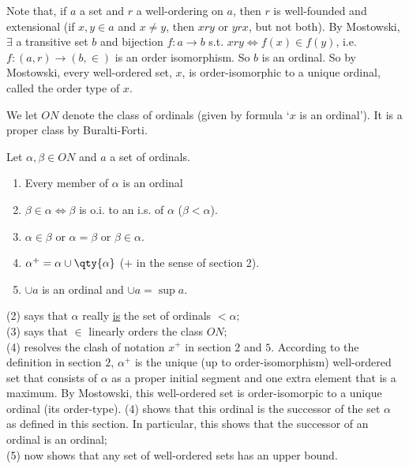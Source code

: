Note that, if $a$ a set and $r$ a well-ordering on $a$, then $r$ is well-founded and extensional (if $x, y \in a$ and $x \neq y$, then $xry$ or $yrx$, but not both).
By Mostowski, $\exists$ a transitive set $b$ and bijection $f : a \to b$ s.t. $x r y \iff f(x) \in f(y)$, i.e. $f: (a, r) \to (b, \in)$ is an order isomorphism.
So $b$ is an ordinal.
So by Mostowski, every well-ordered set, $x$, is order-isomorphic to a unique ordinal, called the order type of $x$.

We let $ON$ denote the class of ordinals (given by formula `$x$ is an ordinal').
It is a proper class by Buralti-Forti.

\begin{proposition}
    Let $\alpha, \beta \in ON$ and $a$ a set of ordinals.
    \begin{enumerate}
        \item Every member of $\alpha$ is an ordinal
        \item $\beta \in \alpha \iff \beta$ is o.i. to an i.s. of $\alpha$ ($\beta < \alpha$).
        \item $\alpha \in \beta$ or $\alpha = \beta$ or $\beta \in \alpha$.
        \item $\alpha^+ = \alpha \cup \qty{\alpha}$ ($+$ in the sense of section 2).
        \item $\cup a$ is an ordinal and $\cup a = \sup a$.
    \end{enumerate}
\end{proposition}

\begin{remark}
    (2) says that $\alpha$ really \underline{is} the set of ordinals $< \alpha$; \\
    (3) says that $\in$ linearly orders the class $ON$; \\
    (4) resolves the clash of notation $x^+$ in section $2$ and $5$.
    According to the definition in section $2$, $\alpha^+$ is the unique (up to order-isomorphism) well-ordered set that consists of $\alpha$ as a proper initial segment and one extra element that is a maximum.
    By Mostowski, this well-ordered set is order-isomorpic to a unique ordinal (its order-type).
    (4) shows that this ordinal is the successor of the set $\alpha$ as defined in this section.
    In particular, this shows that the successor of an ordinal is an ordinal; \\
    (5) now shows that any set of well-ordered sets has an upper bound.
\end{remark}

